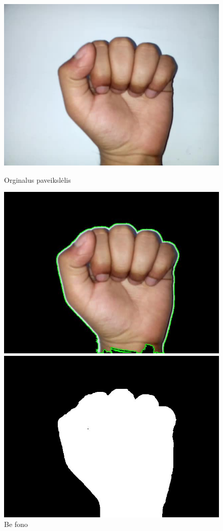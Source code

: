 \documentclass{VUMIFInfKursinis}
\begin{document}
\begin{figure}[H]
	\begin{minipage}{.3\textwidth}
		\centering
		\includegraphics[width=.8\linewidth]{img/A}
		\caption{Orginalus paveikslėlis}
		\label{img:a-sign}
	\end{minipage}\hspace{\fill}%
	\begin{minipage}{.3\textwidth}
		\centering
		\includegraphics[width=.8\linewidth]{img/A-black}
		\caption{Be fono}
		\label{img:a-black-sign}
	\end{minipage}\hspace{\fill}%
	\begin{minipage}{.3\textwidth}
		\centering
		\includegraphics[width=.8\linewidth]{img/A-white}

\end{minipage}
\end{figure}
\end{document}
